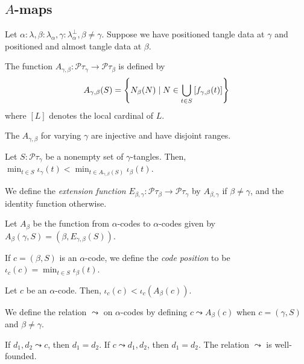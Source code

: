 \documentclass{article}
\begin{document}
\subsection{\( A \)-maps}

Let \( \alpha : \lambda, \beta : \lambda_\alpha, \gamma : \lambda^\bot_\alpha, \beta \neq \gamma \).
Suppose we have positioned tangle data at \( \gamma \) and positioned and almost tangle data at \( \beta \).
\begin{definition}
    The function \( A_{\gamma,\beta} \colon \mathcal P \tau_\gamma \to \mathcal P \tau_\beta \) is defined by
    \[ A_{\gamma,\beta}(S) = \qty{N_\beta(N) \mid N \in \bigcup_{t \in S} \qty[f_{\gamma,\beta}(t)]} \]
    where \( [L] \) denotes the local cardinal of \( L \).
\end{definition}
\begin{lemma}
    The \( A_{\gamma,\beta} \) for varying \( \gamma \) are injective and have disjoint ranges.
\end{lemma}
\begin{lemma}
    Let \( S : \mathcal P \tau_\gamma \) be a nonempty set of \( \gamma \)-tangles.
    Then, \( \min_{t \in S} \iota_\gamma(t) < \min_{t \in A_{\gamma,\beta}(S)} \iota_\beta(t) \).
\end{lemma}
\begin{definition}
    We define the \emph{extension function} \( E_{\beta,\gamma} \colon \mathcal P \tau_\beta \to \mathcal P \tau_\gamma \) by \( A_{\beta,\gamma} \) if \( \beta \neq \gamma \), and the identity function otherwise.
\end{definition}
\begin{definition}
    Let \( A_\beta \) be the function from \( \alpha \)-codes to \( \alpha \)-codes given by \( A_\beta(\gamma, S) = (\beta, E_{\gamma,\beta}(S)) \).
\end{definition}
\begin{definition}
    If \( c = (\beta, S) \) is an \( \alpha \)-code, we define the \emph{code position} to be \( \iota_c(c) = \min_{t \in S} \iota_\beta(t) \).
\end{definition}
\begin{lemma}
    Let \( c \) be an \( \alpha \)-code.
    Then, \( \iota_c(c) < \iota_c(A_\beta(c)) \).
\end{lemma}
\begin{definition}
    We define the relation \( \leadsto \) on \( \alpha \)-codes by defining \( c \leadsto A_\beta(c) \) when \( c = (\gamma, S)\) and \( \beta \neq \gamma \).
\end{definition}
\begin{lemma}
    If \( d_1, d_2 \leadsto c \), then \( d_1 = d_2 \).
    If \( c \leadsto d_1, d_2 \), then \( d_1 = d_2 \).
    The relation \( \leadsto \) is well-founded.
\end{lemma}
\end{document}

